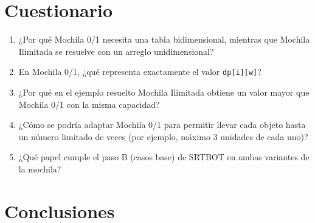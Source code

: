 \documentclass{article}
\begin{document}
\section{Cuestionario}
\begin{enumerate}
    \item ¿Por qué Mochila 0/1 necesita una tabla bidimensional, mientras que Mochila Ilimitada se resuelve con un arreglo unidimensional?
    \item En Mochila 0/1, ¿qué representa exactamente el valor \texttt{dp[i][w]}?
    \item ¿Por qué en el ejemplo resuelto Mochila Ilimitada obtiene un valor mayor que Mochila 0/1 con la misma capacidad?
    \item ¿Cómo se podría adaptar Mochila 0/1 para permitir llevar cada objeto hasta un número limitado de veces (por ejemplo, máximo 3 unidades de cada uno)?
    \item ¿Qué papel cumple el paso B (casos base) de SRTBOT en ambas variantes de la mochila?
\end{enumerate}

\section{Conclusiones}

	
	
    
%
%
%
			
\end{document}
